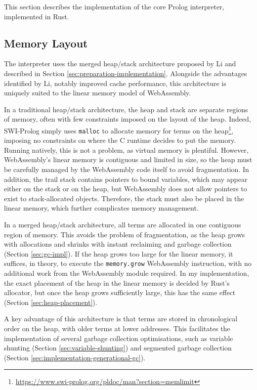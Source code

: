 \label{sec:core-interpreter}

This section describes the implementation of the core Prolog interpreter, implemented in Rust.

\subsection{Memory Layout}

\label{sec:memory-layout}

The interpreter uses the merged heap/stack architecture proposed by Li \cite{liEfficientMemoryManagement2000} and described in Section \ref{sec:preparation-implementation}. Alongside the advantages identified by Li, notably improved cache performance, this architecture is uniquely suited to the linear memory model of WebAssembly.

In a traditional heap/stack architecture, the heap and stack are separate regions of memory, often with few constraints imposed on the layout of the heap. Indeed, SWI-Prolog simply uses \texttt{malloc} to allocate memory for terms on the heap\footnote{\url{https://www.swi-prolog.org/pldoc/man?section=memlimit}}, imposing no constraints on where the C runtime decides to put the memory. Running natively, this is not a problem, as virtual memory is plentiful. However, WebAssembly's linear memory is contiguous and limited in size, so the heap must be carefully managed by the WebAssembly code itself to avoid fragmentation. In addition, the trail stack contains pointers to bound variables, which may appear either on the stack or on the heap, but WebAssembly does not allow pointers to exist to stack-allocated objects. Therefore, the stack must also be placed in the linear memory, which further complicates memory management.

In a merged heap/stack architecture, all terms are allocated in one contiguous region of memory. This avoids the problem of fragmentation, as the heap grows with allocations and shrinks with instant reclaiming and garbage collection (Section \ref{sec:gc-impl}). If the heap grows too large for the linear memory, it suffices, in theory, to execute the \texttt{memory.grow} WebAssembly instruction, with no additional work from the WebAssembly module required. In my implementation, the exact placement of the heap in the linear memory is decided by Rust's allocator, but once the heap grows sufficiently large, this has the same effect (Section \ref{sec:heap-placement}).

A key advantage of this architecture is that terms are stored in chronological order on the heap, with older terms at lower addresses. This facilitates the implementation of several garbage collection optimisations, such as variable shunting (Section \ref{sec:variable-shunting}) and segmented garbage collection (Section \ref{sec:implementation-generational-gc}).

